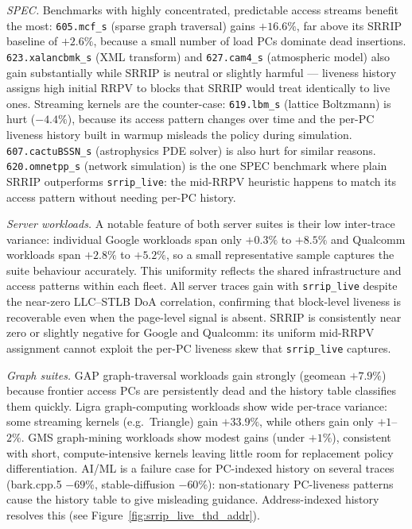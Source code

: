 \documentclass[12pt]{article}
\begin{document}
\textit{SPEC.}
Benchmarks with highly concentrated, predictable access streams benefit
the most: \texttt{605.mcf\_s} (sparse graph traversal) gains
$+16.6\%$, far above its SRRIP baseline of $+2.6\%$, because a small
number of load PCs dominate dead insertions.
\texttt{623.xalancbmk\_s} (XML transform) and \texttt{627.cam4\_s}
(atmospheric model) also gain substantially while SRRIP is neutral or
slightly harmful --- liveness history assigns high initial RRPV to blocks
that SRRIP would treat identically to live ones.
Streaming kernels are the counter-case: \texttt{619.lbm\_s} (lattice
Boltzmann) is hurt ($-4.4\%$), because its access pattern changes over
time and the per-PC liveness history built in warmup misleads the policy
during simulation.
\texttt{607.cactuBSSN\_s} (astrophysics PDE solver) is also hurt for
similar reasons.
\texttt{620.omnetpp\_s} (network simulation) is the one SPEC benchmark
where plain SRRIP outperforms \texttt{srrip\_live}: the mid-RRPV
heuristic happens to match its access pattern without needing per-PC
history.

\textit{Server workloads.}
A notable feature of both server suites is their low inter-trace variance:
individual Google workloads span only $+0.3\%$ to $+8.5\%$ and Qualcomm
workloads span $+2.8\%$ to $+5.2\%$, so a small representative sample
captures the suite behaviour accurately.
This uniformity reflects the shared infrastructure and access patterns
within each fleet.
All server traces gain with \texttt{srrip\_live} despite the near-zero
LLC--STLB DoA correlation, confirming that block-level liveness is
recoverable even when the page-level signal is absent.
SRRIP is consistently near zero or slightly negative for Google and
Qualcomm: its uniform mid-RRPV assignment cannot exploit the per-PC
liveness skew that \texttt{srrip\_live} captures.

\textit{Graph suites.}
GAP graph-traversal workloads gain strongly (geomean $+7.9\%$) because
frontier access PCs are persistently dead and the history table classifies
them quickly.
Ligra graph-computing workloads show wide per-trace variance: some
streaming kernels (e.g.\ Triangle) gain $+33.9\%$, while others gain
only $+1$--$2\%$.
GMS graph-mining workloads show modest gains (under $+1\%$), consistent
with short, compute-intensive kernels leaving little room for replacement
policy differentiation.
AI/ML is a failure case for PC-indexed history on several traces
(bark.cpp.5 $-69\%$, stable-diffusion $-60\%$): non-stationary
PC-liveness patterns cause the history table to give misleading guidance.
Address-indexed history resolves this (see Figure~\ref{fig:srrip_live_thd_addr}).
\end{document}
